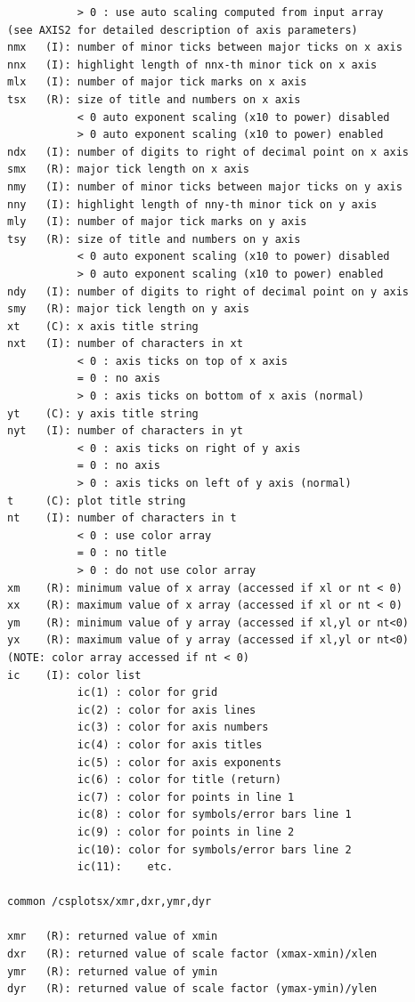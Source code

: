 \documentclass[11pt]{report}
\begin{document}
\begin{verbatim}
           > 0 : use auto scaling computed from input array
(see AXIS2 for detailed description of axis parameters)
nmx   (I): number of minor ticks between major ticks on x axis
nnx   (I): highlight length of nnx-th minor tick on x axis
mlx   (I): number of major tick marks on x axis
tsx   (R): size of title and numbers on x axis
           < 0 auto exponent scaling (x10 to power) disabled
           > 0 auto exponent scaling (x10 to power) enabled
ndx   (I): number of digits to right of decimal point on x axis
smx   (R): major tick length on x axis
nmy   (I): number of minor ticks between major ticks on y axis
nny   (I): highlight length of nny-th minor tick on y axis
mly   (I): number of major tick marks on y axis
tsy   (R): size of title and numbers on y axis
           < 0 auto exponent scaling (x10 to power) disabled
           > 0 auto exponent scaling (x10 to power) enabled
ndy   (I): number of digits to right of decimal point on y axis
smy   (R): major tick length on y axis
xt    (C): x axis title string
nxt   (I): number of characters in xt
           < 0 : axis ticks on top of x axis
           = 0 : no axis
           > 0 : axis ticks on bottom of x axis (normal)
yt    (C): y axis title string
nyt   (I): number of characters in yt
           < 0 : axis ticks on right of y axis
           = 0 : no axis
           > 0 : axis ticks on left of y axis (normal)
t     (C): plot title string
nt    (I): number of characters in t
           < 0 : use color array
           = 0 : no title
           > 0 : do not use color array
xm    (R): minimum value of x array (accessed if xl or nt < 0)
xx    (R): maximum value of x array (accessed if xl or nt < 0)
ym    (R): minimum value of y array (accessed if xl,yl or nt<0)
yx    (R): maximum value of y array (accessed if xl,yl or nt<0)
(NOTE: color array accessed if nt < 0)
ic    (I): color list
           ic(1) : color for grid
           ic(2) : color for axis lines
           ic(3) : color for axis numbers
           ic(4) : color for axis titles
           ic(5) : color for axis exponents
           ic(6) : color for title (return)
           ic(7) : color for points in line 1
           ic(8) : color for symbols/error bars line 1
           ic(9) : color for points in line 2
           ic(10): color for symbols/error bars line 2
           ic(11):    etc.

common /csplotsx/xmr,dxr,ymr,dyr

xmr   (R): returned value of xmin
dxr   (R): returned value of scale factor (xmax-xmin)/xlen
ymr   (R): returned value of ymin
dyr   (R): returned value of scale factor (ymax-ymin)/ylen
\end{verbatim}
\end{document}
